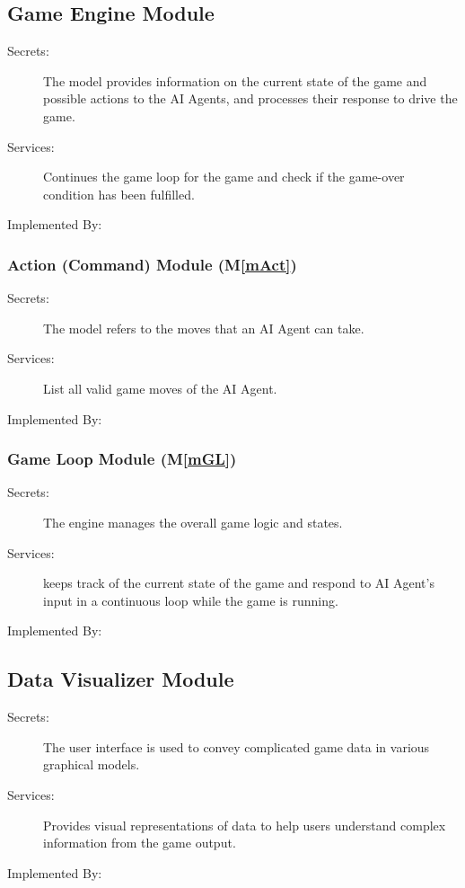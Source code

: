 \documentclass[12pt, titlepage]{article}
\newcommand{\mref}[1]{M\ref{#1}}
\begin{document}
\subsection{Game Engine Module}
\begin{description}
\item[Secrets:] The model provides information on the current state of the game and possible actions to the AI Agents, and processes their response to drive the game. 
\item[Services:] Continues the game loop for the game and check if the game-over condition has been fulfilled. 
\item[Implemented By:] \progname{}
\end{description}
\subsubsection{Action (Command) Module (\mref{mAct})}
\begin{description}
\item[Secrets:] The model refers to the moves that an AI Agent can take. 
\item[Services:] List all valid game moves of the AI Agent. 
\item[Implemented By:] \progname{}
\end{description}
\subsubsection{Game Loop Module (\mref{mGL})}
\begin{description}
\item[Secrets:] The engine manages the overall game logic and states. 
\item[Services:] keeps track of the current state of the game and respond to AI Agent's input in a continuous loop while the game is running. 
\item[Implemented By:] \progname{}
\end{description}

\subsection{Data Visualizer Module}

\begin{description}
\item[Secrets:] The user interface is used to convey complicated game data in various graphical models. 
\item[Services:] Provides visual representations of data to help users understand complex information from the game output. 
\item[Implemented By:] \progname{}
\end{description}
\end{document}
